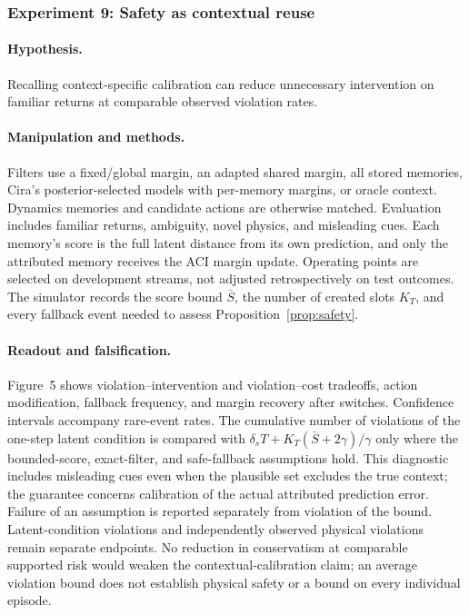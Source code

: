 \subsubsection{Experiment 9: Safety as contextual reuse}
\paragraph{Hypothesis.}
Recalling context-specific calibration can reduce unnecessary intervention on familiar returns at comparable observed violation rates.

\paragraph{Manipulation and methods.}
Filters use a fixed/global margin, an adapted shared margin, all stored memories, Cira's posterior-selected models with per-memory margins, or oracle context. Dynamics memories and candidate actions are otherwise matched. Evaluation includes familiar returns, ambiguity, novel physics, and misleading cues. Each memory's score is the full latent distance from its own prediction, and only the attributed memory receives the ACI margin update. Operating points are selected on development streams, not adjusted retrospectively on test outcomes. The simulator records the score bound $\bar S$, the number of created slots $K_T$, and every fallback event needed to assess Proposition~\ref{prop:safety}.

\paragraph{Readout and falsification.}
Figure~5 shows violation--intervention and violation--cost tradeoffs, action modification, fallback frequency, and margin recovery after switches. Confidence intervals accompany rare-event rates. The cumulative number of violations of the one-step latent condition is compared with $\delta_s T+K_T(\bar S+2\gamma)/\gamma$ only where the bounded-score, exact-filter, and safe-fallback assumptions hold. This diagnostic includes misleading cues even when the plausible set excludes the true context; the guarantee concerns calibration of the actual attributed prediction error. Failure of an assumption is reported separately from violation of the bound. Latent-condition violations and independently observed physical violations remain separate endpoints. No reduction in conservatism at comparable supported risk would weaken the contextual-calibration claim; an average violation bound does not establish physical safety or a bound on every individual episode.

